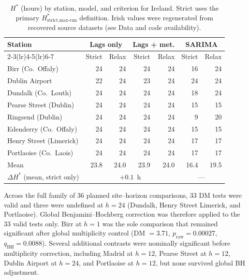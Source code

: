 \documentclass[12pt,a4paper]{article}
\begin{document}
\begin{table}[htbp]
\centering
\caption{$H^*$ (hours) by station, model, and criterion for Ireland.
  Strict uses the primary $H^*_{\text{strict,max-run}}$ definition.
  Irish values were regenerated from recovered source datasets (see Data and
  code availability).}
\label{tab:ireland_hstar}
\small
\begin{tabular}{lrrrrrr}
\toprule
Station &
\multicolumn{2}{c}{Lags only} &
\multicolumn{2}{c}{Lags + met.} &
\multicolumn{2}{c}{SARIMA} \\
\cmidrule(lr){2-3}\cmidrule(lr){4-5}\cmidrule(lr){6-7}
& Strict & Relax & Strict & Relax & Strict & Relax \\
\midrule
Birr (Co.\ Offaly)              & 24 & 24 & 24 & 24 & 16 & 24 \\
Dublin Airport                  & 22 & 24 & 23 & 24 & 24 & 24 \\
Dundalk (Co.\ Louth)            & 24 & 24 & 24 & 24 & 18 & 24 \\
Pearse Street (Dublin)          & 24 & 24 & 24 & 24 & 15 & 15 \\
Ringsend (Dublin)               & 24 & 24 & 24 & 24 &  9 & 20 \\
Edenderry (Co.\ Offaly)         & 24 & 24 & 24 & 24 & 15 & 15 \\
Henry Street (Limerick)         & 24 & 24 & 24 & 24 & 17 & 17 \\
Portlaoise (Co.\ Laois)         & 24 & 24 & 24 & 24 & 17 & 17 \\
\midrule
Mean                            & 23.8 & 24.0 & 23.9 & 24.0 & 16.4 & 19.5 \\
$\Delta H^*$ (mean, strict only) & \multicolumn{4}{c}{$+0.1$~h} & \multicolumn{2}{c}{---} \\
\bottomrule
\end{tabular}
\end{table}

Across the full family of 36 planned site--horizon comparisons, 33 DM
tests were valid and three were undefined at $h=24$ (Dundalk, Henry Street
Limerick, and Portlaoise). Global Benjamini--Hochberg correction was therefore
applied to the 33 valid tests only. Birr at $h=1$ was the sole comparison
that remained significant after global multiplicity control
(DM $=3.71$, $p_{\mathrm{raw}}=0.00027$,
$q_{\mathrm{BH}}=0.0088$).
Several additional contrasts were nominally significant before multiplicity
correction, including Madrid at $h=12$, Pearse Street at $h=12$,
Dublin Airport at $h=24$, and Portlaoise at $h=12$, but none survived
global BH adjustment.
\end{document}
